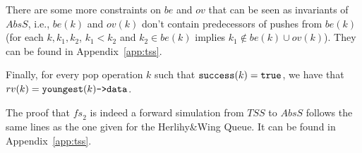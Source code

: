 There are some more constraints on $be$ and $ov$ that can be seen as invariants of $AbsS$, i.e., $be(k)$ and $ov(k)$ don't contain predecessors of pushes from $be(k)$ (for each $k, k_1, k_2$, $k_1 < k_2$ and $k_2 \in be(k)$ implies $k_1\not\in be(k)\cup ov(k)$). They can be found in Appendix~\ref{app:tss}.

Finally, for every pop operation $k$ such that ${\tt success}(k)={\tt true}$, we have that $rv(k)={\tt youngest}(k)\text{\tt->data}$. 

The proof that $\mathit{fs}_2$ is indeed a forward simulation from $\mathit{TSS}$ to $AbsS$ follows the same lines as the one given for the Herlihy\&Wing Queue. It can be found in Appendix~\ref{app:tss}.








